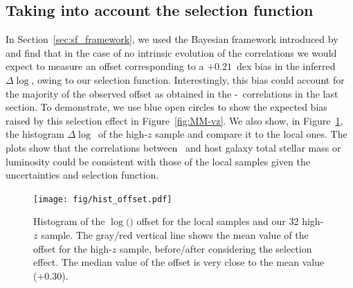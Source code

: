 \documentclass[apj]{emulateapj}
\begin{document}


\subsection{Taking into account the selection function}
\label{select_eff}

In Section~\ref{sec:sf_framework}, we used the Bayesian framework introduced by \citet{Schulze2011} and find that in the case of no intrinsic evolution of the correlations we would expect to measure an offset corresponding to a $+0.21$~dex bias in the inferred $\Delta \log$\mbh, owing to our selection function. Interestingly, this bias could account for the majority of the observed offset as obtained in the \mbh-\smass\ correlations in the last section. %
To demonstrate, we use blue open circles to show the expected bias raised by this selection effect in Figure~\ref{fig:MM-vz}. We also show, in Figure~\ref{fig:offset_hist}, the histogram $\Delta \log$\mbh\ of the high-$z$ sample and compare it to the local ones. 
The plots show that the correlations between \mbh\ and host galaxy total stellar mass or luminosity could be consistent with those of the local samples given the uncertainties and selection function.


\begin{figure}
\centering
{
\texttt{[image: fig/hist\_offset.pdf]}
}
\caption{\label{fig:offset_hist} 
Histogram of the $\log($\mbh$)$ offset for the local samples and our 32 high-$z$ sample. The gray/red vertical line shows the mean value of the offset for the high-$z$ sample, before/after considering the selection effect. The median value of the offset is very close to the mean value ($+0.30$).
}
\end{figure} 

\end{document}
